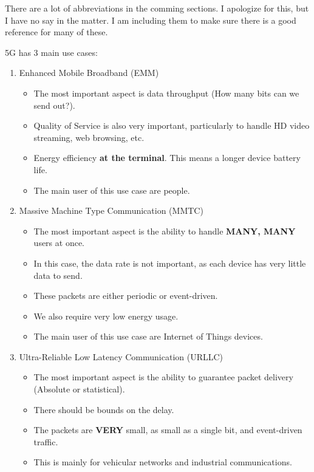 \begin{remark*}
  There are a lot of abbreviations in the comming sections.
  I apologize for this, but I have no say in the matter.
  I am including them to make sure there is a good reference for many of these.
\end{remark*}

5G has 3 main use cases:
\begin{enumerate}[noitemsep]
\item Enhanced Mobile Broadband (EMM)
  \begin{itemize}[noitemsep]
  \item The most important aspect is data throughput (How many bits can we send out?).
  \item Quality of Service is also very important, particularly to handle HD video streaming, web browsing, etc.
  \item Energy efficiency \textbf{at the terminal}. This means a longer device battery life.
  \item The main user of this use case are people.
  \end{itemize}
\item Massive Machine Type Communication (MMTC)
  \begin{itemize}[noitemsep]
  \item The most important aspect is the ability to handle \textbf{MANY, MANY} users at once.
  \item In this case, the data rate is not important, as each device has very little data to send.
  \item These packets are either periodic or event-driven.
  \item We also require very low energy usage.
  \item The main user of this use case are Internet of Things devices.
  \end{itemize}
\item Ultra-Reliable Low Latency Communication (URLLC)
  \begin{itemize}[noitemsep]
  \item The most important aspect is the ability to guarantee packet delivery (Absolute or statistical).
  \item There should be bounds on the delay.
  \item The packets are \textbf{VERY} small, as small as a single bit, and event-driven traffic.
  \item This is mainly for vehicular networks and industrial communications.
  \end{itemize}
\end{enumerate}

